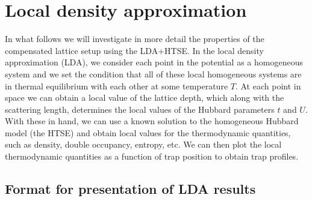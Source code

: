 %
%



\section{ Local density approximation }
\label{sec:lda}

In what follows we will investigate in more detail the properties of the
compensated lattice setup using the LDA+HTSE.   In the local density
approximation (LDA), we consider each point in the potential as a homogeneous
system and we set the condition that all of these local homogeneous systems are
in thermal equilibrium with each other  at some temperature $T$.   At each
point in space we can obtain a local value of the lattice depth, which along
with the scattering length, determines the local values of the Hubbard
parameters $t$ and $U$.  With these in hand, we can use a known solution to the
homogeneous Hubbard model (the HTSE) and obtain local values for the
thermodynamic quantities, such as density, double occupancy, entropy, etc.   We
can then plot the local thermodynamic quantities as a function of trap position
to obtain trap profiles.  

\subsection{Format for presentation of LDA results} 

